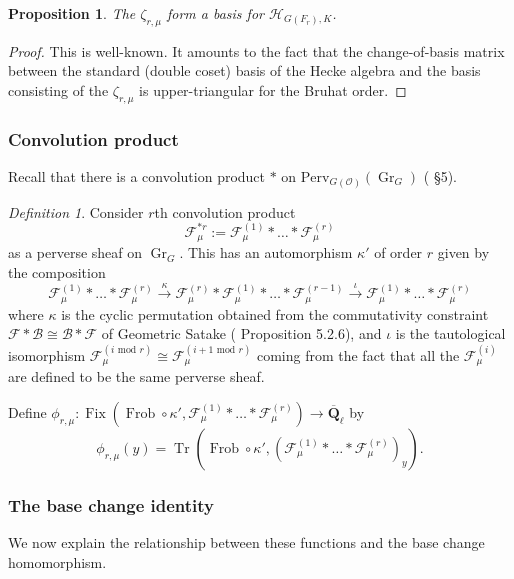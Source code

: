 \documentclass[reqno]{amsart}
\numberwithin{equation}{section}
\newcommand{\Q}{\mathbf{Q}}
\newcommand{\ol}[1]{\overline{#1}}
\newcommand{\Cal}[1]{\mathcal{#1}}
\newcommand{\co}{\colon}
\newcommand{\mrm}[1]{\mathrm{#1}}
\DeclareMathOperator{\Frob}{Frob}
\DeclareMathOperator{\Tr}{Tr}
\DeclareMathOperator{\Gr}{Gr}
\DeclareMathOperator{\Fix}{Fix}
\newtheorem{prop}[thm]{Proposition}
\theoremstyle{remark}
\newtheorem{defn}[thm]{Definition}
\numberwithin{equation}{section}
\begin{document}
\begin{prop}
The $\zeta_{r,\mu}$ form a basis for $\Cal{H}_{G(F_r),K}$. 
\end{prop} 

\begin{proof}
This is well-known. It amounts to the fact that the change-of-basis matrix between the standard (double coset) basis of the Hecke algebra and the basis consisting of the $\zeta_{r,\mu}$ is upper-triangular for the Bruhat order. 
\end{proof}


\subsubsection{Convolution product} Recall that there is a convolution product $*$ on $\mrm{Perv}_{G(\Cal{O})} (\Gr_G)$ (\cite{Zhu15} \S 5).

\begin{defn}\label{def: sph conv product} Consider $r$th convolution product 
\[
\Cal{F}_{\mu}^{*r} := \Cal{F}_{\mu}^{(1)} *  \ldots * \Cal{F}_{\mu}^{(r)} 
\]
as a perverse sheaf on $\Gr_{G}$. This has an automorphism $\kappa'$ of order $r$ given by the composition	
\[
 \Cal{F}_{\mu}^{(1)} *  \ldots * \Cal{F}_{\mu}^{(r)}  \xrightarrow{\kappa} \Cal{F}_{\mu}^{(r)}  *  \Cal{F}_{\mu}^{(1)} *  \ldots * \Cal{F}_{\mu}^{(r-1)}   \xrightarrow{\iota} \Cal{F}_{\mu}^{(1)} *  \ldots * \Cal{F}_{\mu}^{(r)}
\]
where $\kappa$ is the cyclic permutation obtained from the commutativity constraint $\Cal{F} * \Cal{B} \cong \Cal{B} * \Cal{F}$ of Geometric Satake  (\cite{Zhu15} Proposition 5.2.6), and $\iota$ is the tautological isomorphism $\Cal{F}_{\mu}^{(i\text{ mod }r) } \cong \Cal{F}_{\mu}^{(i+1\text{ mod }r ) 	}$ coming from the fact that all the $\Cal{F}_{\mu}^{(i)}$ are defined to be the same perverse sheaf. 
 
Define $\phi_{r, \mu} \co \Fix(\Frob \circ \kappa', \Cal{F}_{\mu}^{(1)} *  \ldots * \Cal{F}_{\mu}^{(r)}  ) \rightarrow \ol{\Q}_{\ell} $ by
\[
\phi_{r,\mu}(y) =  \Tr(\Frob \circ \kappa', (\Cal{F}_{\mu}^{(1)} * \ldots * \Cal{F}_{\mu}^{(r)})_y).
\]
\end{defn}

\subsubsection{The base change identity} We now explain the relationship between these functions and the base change homomorphism. 
\end{document}
